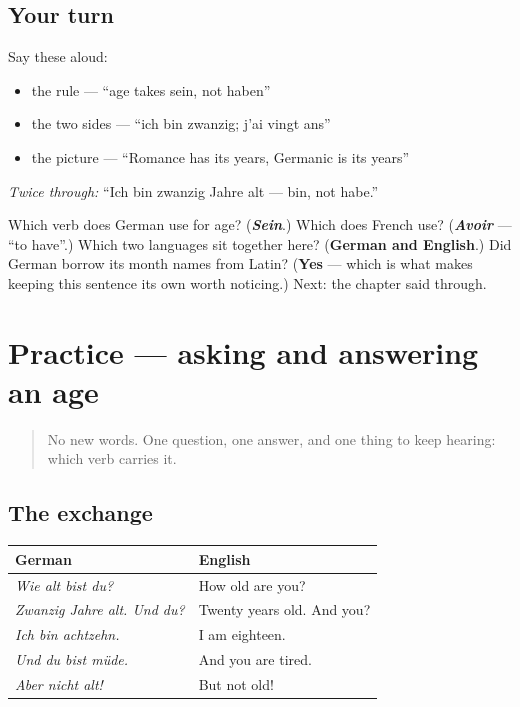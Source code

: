 \subsection*{Your turn}
Say these aloud:

\begin{itemize}
\raggedright
  \item the rule — \textquotedblleft{}age takes sein, not haben\textquotedblright{}
  \item the two sides — \textquotedblleft{}ich bin zwanzig; j'ai vingt ans\textquotedblright{}
  \item the picture — \textquotedblleft{}Romance has its years, Germanic is its years\textquotedblright{}
\end{itemize}

\emph{Twice through:} \textquotedblleft{}Ich bin zwanzig Jahre alt — bin, not habe.\textquotedblright{}

\begin{tcolorbox}[breakable,colback=teal!4,colframe=teal!35!black,title={Before you move on}]
Which verb does German use for age? (\emph{\textbf{Sein}}.) Which does French use? (\emph{\textbf{Avoir}} — \textquotedblleft{}to have\textquotedblright{}.) Which two languages sit together here? (\textbf{German and English}.) Did German borrow its month names from Latin? (\textbf{Yes} — which is what makes keeping this sentence its own worth noticing.) Next: the chapter said through.
\end{tcolorbox}
\section[Practice]{Practice — asking and answering an age}

\label{lesson:GE-C14-alter-practice}



\begin{quote}
No new words. One question, one answer, and one thing to keep hearing: which verb carries it.
\end{quote}

\subsection*{The exchange}
\noindent
\begin{tabularx}{\linewidth}{@{}>{\raggedright\arraybackslash}X>{\raggedright\arraybackslash}X@{}}
\toprule
\textbf{German} & \textbf{English} \\
\midrule
\emph{Wie alt bist du?} & How old are you? \\
\emph{Zwanzig Jahre alt. Und du?} & Twenty years old. And you? \\
\emph{Ich bin achtzehn.} & I am eighteen. \\
\emph{Und du bist müde.} & And you are tired. \\
\emph{Aber nicht alt!} & But not old! \\
\bottomrule
\end{tabularx}

